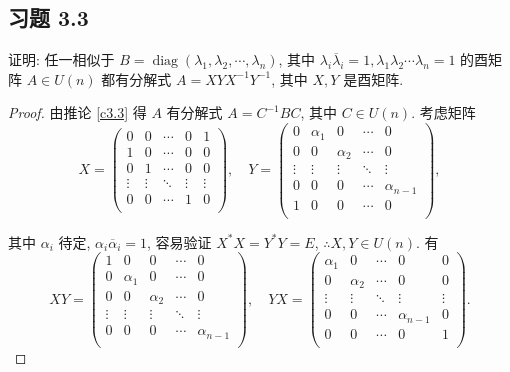 \documentclass{ctexart}
\begin{document}
\subsection{习题 3.3}
\begin{exercise}
    证明: 任一相似于 $B=\operatorname{diag}(\lambda_1,\lambda_2,\cdots,\lambda_n)$, 其中 $\lambda_i\overline{\lambda}_i=1,\lambda_1\lambda_2\cdots\lambda_n=1$ 的酉矩阵 $A\in U(n)$ 都有分解式 $A=XYX^{-1}Y^{-1}$, 其中 $X,Y$ 是酉矩阵.
\end{exercise}
\begin{proof}
    由推论 \ref{c3.3} 得 $A$ 有分解式 $A=C^{-1}BC$, 其中 $C\in U(n)$. 考虑矩阵
    \[X=\begin{pmatrix}
        0 & 0 & \cdots & 0 & 1 \\
        1 & 0 & \cdots & 0 & 0 \\
        0 & 1 & \cdots & 0 & 0 \\
        \vdots & \vdots & \ddots & \vdots & \vdots \\
        0 & 0 & \cdots & 1 & 0 \\
    \end{pmatrix},\quad Y=\begin{pmatrix}
        0 & \alpha_1 & 0 & \cdots & 0 \\
        0 & 0 & \alpha_2 & \cdots & 0 \\
        \vdots & \vdots & \vdots & \ddots & \vdots \\
        0 & 0 & 0 & \cdots & \alpha_{n-1} \\
        1 & 0 & 0 & \cdots & 0 \\
    \end{pmatrix},\]

    其中 $\alpha_i$ 待定, $\alpha_i\overline{\alpha}_i=1$, 容易验证 $X^*X=Y^*Y=E$, $\therefore X,Y\in U(n)$. 有
    \[XY=\begin{pmatrix}
        1 & 0 & 0 & \cdots & 0 \\
        0 & \alpha_1 & 0 & \cdots & 0 \\
        0 & 0 & \alpha_2 & \cdots & 0 \\
        \vdots & \vdots & \vdots & \ddots & \vdots \\
        0 & 0 & 0 & \cdots & \alpha_{n-1} \\
    \end{pmatrix},\quad YX=\begin{pmatrix}
        \alpha_1 & 0 & \cdots & 0 & 0 \\
        0 & \alpha_2 & \cdots & 0 & 0 \\
        \vdots & \vdots & \ddots & \vdots & \vdots \\
        0 & 0 & \cdots & \alpha_{n-1} & 0 \\
        0 & 0 & \cdots & 0 & 1 \\
    \end{pmatrix}.\]


\end{proof}
\end{document}
